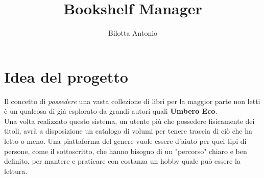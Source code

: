 \documentclass{article}
\author{Bilotta Antonio}
\title{Bookshelf Manager}
\begin{document}
\maketitle
\tableofcontents

\section{Idea del progetto}

Il concetto di \textit{possedere} una vasta collezione di libri per la maggior parte non letti è un qualcosa di già esplorato
da grandi autori quali \textbf{Umbero Eco}.\\ Una volta realizzato questo sistema, un utente più che possedere fisicamente dei titoli, avrà a disposizione un catalogo di volumi per tenere traccia di ciò che ha letto o meno.
Una piattaforma del genere vuole essere d'aiuto per quei tipi di persone, come il sottoscritto, che hanno bisogno di un "percorso" chiaro e ben definito, per
mantere e praticare con costanza un hobby quale può essere la lettura.
\end{document}
